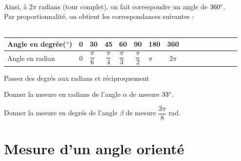     Ainsi, à $2\pi$ radians (tour complet), on fait correspondre un angle de $360\degree$.\\
    Par proportionnalité, on obtient les correspondances suivantes :\\
    \ \\
    \begin{tabular}{ | Xc | Xc | Xc | Xc | Xc | Xc | Xc | Xc |}
         \hline			
           \rowcolor{NavyBlue!55!white}Angle en degrée($\degree$)  & 0 & 30 & 45 & 60 & 90 & 180 & 360 \\ \hline
           \rowcolor{NavyBlue!25!white}Angle en radian & $0$ & $\dfrac{\pi}{6}$ & $\dfrac{\pi}{4}$ & $\dfrac{\pi}{3}$ & $\dfrac{\pi}{2}$ & $\pi$ & $2\pi$ \\
         \hline  
    \end{tabular}
    
    \begin{bmethodet}{Passer des degrés aux radians et réciproquement}
        \begin{enumMet}
            \item Donner la mesure en radians de l'angle $\alpha$ de mesure $33\degree$.
            \item Donner la mesure en degrés de l'angle $\beta$ de mesure $\dfrac{3\pi}{8}$ rad.
        \end{enumMet}
    \end{bmethodet}
    
\section{Mesure d'un angle orienté}

